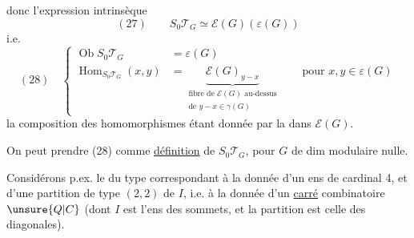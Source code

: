 donc l'expression intrinsèque
\[
(27)\qquad S_0\mathcal T_G\simeq\mathcal E(G)(\varepsilon(G))
\]
i.e.
\[
(28)\quad\left\{
\begin{aligned}
\operatorname{Ob}S_0\mathcal T_G&=\varepsilon(G)\\
\operatorname{Hom}_{S_0\mathcal T_G}(x,y)&=
\underbrace{\mathcal E(G)_{y-x}}_{\substack{\text{fibre de }\mathcal E(G)\text{ au-dessus}\\\text{de }y-x\in\gamma(G)}}
\qquad\text{pour }x,y\in\varepsilon(G)
\end{aligned}\right.
\]
la composition des homomorphismes étant donnée par la  dans $\mathcal E(G)$.

On peut prendre (28) comme \uline{définition} de $S_0\mathcal T_G$, pour $G$ de dim modulaire nulle.


Considérons p.ex. le  du type
correspondant à la donnée d'un ens  de cardinal 4, et d'une partition de type $(2,2)$ de $I$, i.e. à la donnée d'un \uline{carré} combinatoire $\unsure{Q|C}$ (dont $I$ est l'ens des sommets, et la partition est celle des diagonales). 
